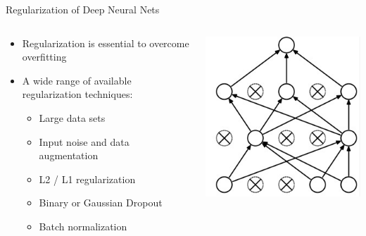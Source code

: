 \documentclass{beamer}
\begin{document}
\begin{frame}{Regularization of Deep Neural Nets}	

	
		\begin{columns}[T] %
			\begin{column}{.8\textwidth}
				\vspace{-0.5cm}
	\begin{itemize}
		\item Regularization is essential to overcome overfitting
		\item A wide range of available regularization techniques:
		\begin{itemize}
			\item Large data sets
			\item Input noise and data augmentation
			\item L2 / L1 regularization
			\item Binary or Gaussian Dropout
			\item Batch normalization
		\end{itemize}
	\end{itemize}
			\end{column}
			\hfill%
			\hspace{-2.cm}
			\begin{column}{.53\textwidth}
				\vspace{-0.5cm}
				\begin{center}
					\vspace{.5cm}
					\includegraphics[scale=0.25]{./img/do.png}
				\end{center}
			\end{column}%
		\end{columns}
	

\end{frame}
\end{document}
